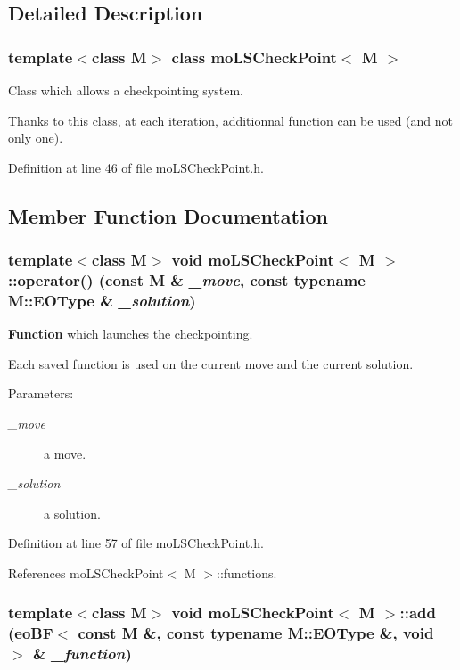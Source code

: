 \subsection{Detailed Description}
\subsubsection*{template$<$class M$>$ class moLSCheckPoint$<$ M $>$}

Class which allows a checkpointing system. 

Thanks to this class, at each iteration, additionnal function can be used (and not only one). 

Definition at line 46 of file moLSCheckPoint.h.

\subsection{Member Function Documentation}
\subsubsection{\setlength{\rightskip}{0pt plus 5cm}template$<$class M$>$ void {\bf moLSCheckPoint}$<$ M $>$::operator() (const M \& {\em \_\-move}, const typename M::EOType \& {\em \_\-solution})\hspace{0.3cm}{\tt  [inline]}}\label{classmo_l_s_check_point_e9b9d41e40dd7bab648327686b2b938d}


{\bf Function} which launches the checkpointing. 

Each saved function is used on the current move and the current solution.

\begin{Desc}
\item[Parameters:]
\begin{description}
\item[{\em \_\-move}]a move. \item[{\em \_\-solution}]a solution. \end{description}
\end{Desc}


Definition at line 57 of file moLSCheckPoint.h.

References moLSCheckPoint$<$ M $>$::functions.
\subsubsection{\setlength{\rightskip}{0pt plus 5cm}template$<$class M$>$ void {\bf moLSCheckPoint}$<$ M $>$::add ({\bf eoBF}$<$ const M \&, const typename M::EOType \&, void $>$ \& {\em \_\-function})\hspace{0.3cm}{\tt  [inline]}}\label{classmo_l_s_check_point_f95f2dc556cdfbdc81688562ca95202d}


